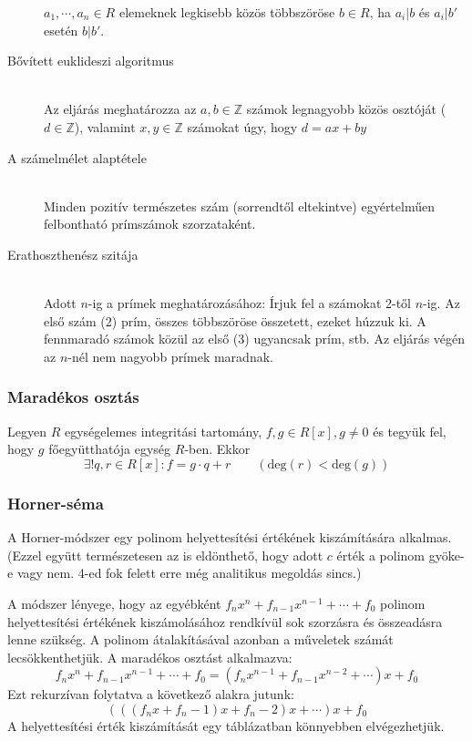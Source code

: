 \documentclass[margin=0px]{article}
\newcommand{\Z}{\mathbb{Z}}
\begin{document}
\begin{description}
        $a_1,\cdots,a_n \in R$ elemeknek legkisebb közös többszöröse $b\in R$, ha $a_i|b$ és $a_i|b'$ esetén $b|b'$.
    \item[Bővített euklideszi algoritmus] \hfill \\
        Az eljárás meghatározza az $a,b \in \Z$ számok legnagyobb közös osztóját ($d\in\Z$), valamint $x,y \in\Z$ számokat úgy, hogy $d = ax+by$
    \item[A számelmélet alaptétele] \hfill \\
        Minden pozitív természetes szám (sorrendtől eltekintve) egyértelműen felbontható prímszámok szorzataként.
    \item[Erathoszthenész szitája] \hfill \\
        Adott $n$-ig a prímek meghatározásához:
        Írjuk fel a számokat 2-től $n$-ig. Az első szám (2) prím, összes többszöröse összetett, ezeket húzzuk ki. A fennmaradó számok közül az első (3) ugyancsak prím, stb.  Az eljárás végén az $n$-nél nem nagyobb prímek maradnak.
\end{description}
\subsubsection{Maradékos osztás}
Legyen $R$ egységelemes integritási tartomány, $f,g\in R[x], g \neq 0$ és tegyük fel, hogy $g$ főegyütthatója egység $R$-ben. Ekkor
\[ \exists! q,r \in R[x] : f = g\cdot q+r \qquad (\text{deg}(r) < \text{deg}(g) )\]

\subsubsection{Horner-séma}
A Horner-módszer egy polinom helyettesítési értékének kiszámítására alkalmas. (Ezzel együtt természetesen az is eldönthető, hogy adott $c$ érték a polinom gyöke-e vagy nem. 4-ed fok felett erre még analitikus megoldás sincs.)

A módszer lényege, hogy az egyébként $f_nx^n+f_{n-1}x^{n-1}+\cdots+f_0$ polinom helyettesítési értékének kiszámolásához rendkívül sok szorzásra és összeadásra lenne szükség. A polinom átalakításával azonban a műveletek számát lecsökkenthetjük. A maradékos osztást alkalmazva:
\[f_nx^n+f_{n-1}x^{n-1}+\cdots+f_0 = (f_nx^{n-1}+f_{n-1}x^{n-2}+\cdots)x+f_0\]
Ezt rekurzívan folytatva a következő alakra jutunk:
\[(((f_nx+f_n-1)x+f_n-2)x+\cdots)x+f_0\]
A helyettesítési érték kiszámítását egy táblázatban könnyebben elvégezhetjük.
\end{document}
